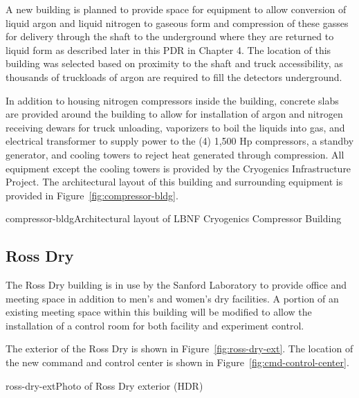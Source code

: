 A new building is planned to provide space for equipment to allow conversion of liquid argon and liquid nitrogen to gaseous form and compression of these gasses for delivery through the shaft to the underground where they are returned to liquid form as described later in this PDR in Chapter 4.  The location of this building was selected based on proximity to the shaft and truck accessibility, as thousands of truckloads of argon are required to fill the detectors underground.

In addition to housing nitrogen compressors inside the building, concrete slabs are provided around the building to allow for installation of argon and nitrogen receiving dewars for truck unloading, vaporizers to boil the liquids into gas, and electrical transformer to supply power to the (4) 1,500 Hp compressors, a standby generator, and cooling towers to reject heat generated through compression.  All equipment except the cooling towers is provided by the Cryogenics Infrastructure Project. The architectural layout of this building and surrounding equipment is provided in Figure~\ref{fig:compressor-bldg}.

\begin{cdrfigure}{compressor-bldg}{Architectural layout of LBNF Cryogenics Compressor Building}
\end{cdrfigure}


\subsection{Ross Dry}
\label{sec:fscf-surf-facil-surface-bldg-rossdry}

The Ross Dry building is in use by the Sanford Laboratory to provide office and meeting space in addition to men’s and women’s dry facilities. A portion of an existing meeting space within this building will be modified to allow the installation of a control room for both facility and experiment control.

The exterior of the Ross Dry is shown in Figure~\ref{fig:ross-dry-ext}.  The location of the new command and control center is shown in Figure~\ref{fig:cmd-control-center}.

\begin{cdrfigure}{ross-dry-ext}{Photo of Ross Dry exterior (HDR)}
\end{cdrfigure}


